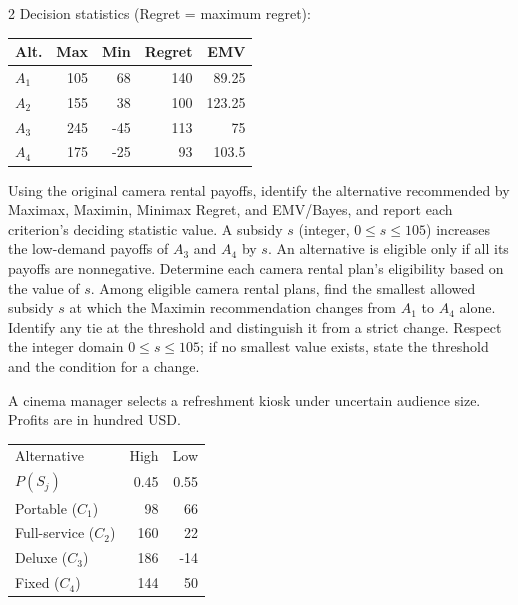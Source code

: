 \begin{multicols}{2}
Decision statistics (Regret = maximum regret):

\vspace{-4mm}
\begin{center}\small\setlength{\tabcolsep}{4pt}
	\begin{tabular}{lrrrr}\toprule
		Alt. & Max & Min & Regret & EMV\\ \midrule
				$A_1$ & 105 & 68 & 140 & 89.25\\
		$A_2$ & 155 & 38 & 100 & 123.25\\
		$A_3$ & 245 & -45 & 113 & 75\\
		$A_4$ & 175 & -25 & 93 & 103.5\\
		\bottomrule
	\end{tabular}
\end{center}
\vspace{-4mm}

\noindent Using the original camera rental payoffs, identify the alternative recommended by Maximax, Maximin, Minimax Regret, and EMV/Bayes, and report each criterion's deciding statistic value.  A subsidy $s$ (integer, $0\leq s\leq105$) increases the low-demand payoffs of $A_3$ and $A_4$ by $s$. An alternative is eligible only if all its payoffs are nonnegative. Determine each camera rental plan's eligibility based on the value of $s$.  Among eligible camera rental plans, find the smallest allowed subsidy $s$ at which the Maximin recommendation changes from $A_1$ to $A_4$ alone. Identify any tie at the threshold and distinguish it from a strict change. Respect the integer domain $0\leq s\leq105$; if no smallest value exists, state the threshold and the condition for a change. 


A cinema manager selects a refreshment kiosk under uncertain audience size. Profits are in hundred USD. \vspace{-3mm}

\begin{center}\small\setlength{\tabcolsep}{4pt}
	\begin{tabular}{lrr}\toprule
		Alternative & High & Low\\
		$P(S_j)$ & 0.45 & 0.55\\ \midrule
				Portable ($C_1$) & 98 & 66\\
		Full-service ($C_2$) & 160 & 22\\
		Deluxe ($C_3$) & 186 & -14\\
		Fixed ($C_4$) & 144 & 50\\
		\bottomrule
	\end{tabular}
\end{center} \vspace{-4mm}


\end{multicols}
